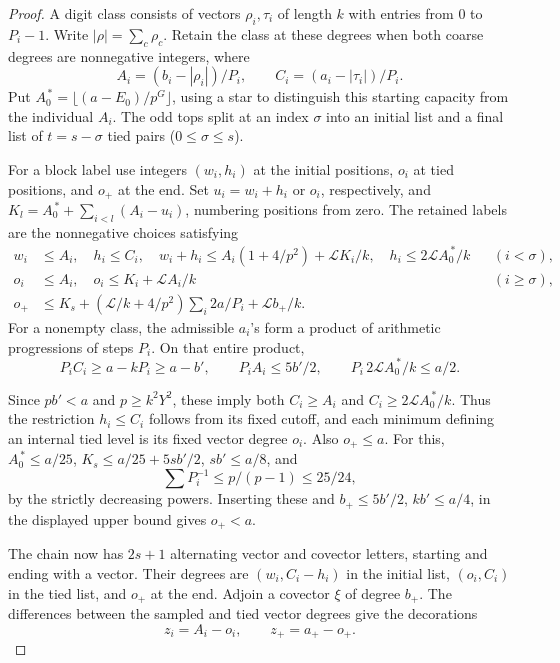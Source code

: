 \begin{proof}
A digit class consists of vectors \(\rho_i,\tau_i\) of length \(k\)
with entries from \(0\) to \(P_i-1\). Write \(|\rho|=\sum_c\rho_c\).
Retain the class at these degrees when both coarse degrees are nonnegative integers, where
\[
 A_i=(b_i-|\rho_i|)/P_i,\qquad C_i=(a_i-|\tau_i|)/P_i .
\]
Put \(A_0^{\,*}=\lfloor(a-E_0)/p^G\rfloor\), using a star to
distinguish this starting capacity from the individual \(A_i\).
The odd tops split at an index \(\sigma\) into an
initial list and a final list of \(t=s-\sigma\) tied pairs
(\(0\le\sigma\le s\)).

For a block label use integers
\((w_i,h_i)\) at the initial positions, \(o_i\) at tied positions,
and \(o_+\) at the end. Set \(u_i=w_i+h_i\) or \(o_i\), respectively,
and \(K_l=A_0^{\,*}+\sum_{i<l}(A_i-u_i)\), numbering positions from zero.
The retained labels are the nonnegative choices satisfying
\begin{align*}
 w_i&\le A_i,\quad h_i\le C_i,\quad
 w_i+h_i\le A_i(1+4/p^2)+\mathcal L K_i/k,\quad
 h_i\le2\mathcal L A_0^{\,*}/k &&(i<\sigma),\\
 o_i&\le A_i,\quad o_i\le K_i+\mathcal L A_i/k &&(i\ge\sigma),\\
 o_+&\le K_s+(\mathcal L/k+4/p^2)\sum_i2a/P_i+\mathcal L b_+/k .
\end{align*}
For a nonempty class, the admissible \(a_i\)'s form a product of
arithmetic progressions of steps \(P_i\). On that entire product,
\[
 P_iC_i\ge a-kP_i\ge a-b',
 \qquad P_iA_i\le5b'/2,\qquad
 P_i\,2\mathcal L A_0^{\,*}/k\le a/2.
\]

Since \(pb'<a\) and \(p\ge k^2Y^2\), these imply both
\(C_i\ge A_i\) and \(C_i\ge 2\mathcal L A_0^{\,*}/k\).
Thus the restriction \(h_i\le C_i\) follows from its fixed
cutoff, and each minimum defining an internal tied level
is its fixed vector degree \(o_i\).
Also \(o_+\le a\). For this, \(A_0^{\,*}\le a/25\),
\(K_s\le a/25+5sb'/2\), \(sb'\le a/8\), and
\[
 \sum P_i^{-1}\le p/(p-1)\le25/24,
\]
by the strictly decreasing
powers. Inserting these and \(b_+\le5b'/2\), \(kb'\le a/4\),
in the displayed upper bound gives \(o_+<a\).

The chain now has \(2s+1\) alternating vector and covector letters,
starting and ending with a vector. Their degrees are
\((w_i,C_i-h_i)\) in the initial list, \((o_i,C_i)\) in the
tied list, and \(o_+\) at the end. Adjoin a covector \(\xi\) of
degree \(b_+\). The differences between the sampled and tied vector degrees give the decorations
\[
 z_i=A_i-o_i,\qquad z_+=a_+-o_+.
\]


\end{proof}
